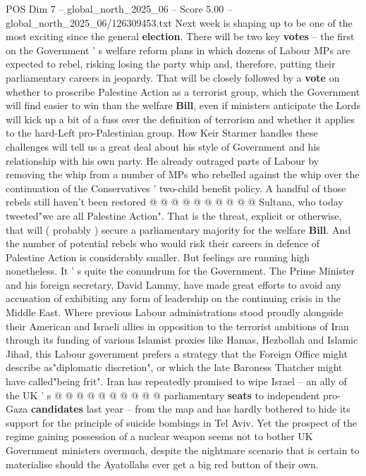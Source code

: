 \begin{textsample}{POS Dim 7 – global\_north\_2025\_06 – Score 5.00 – global\_north\_2025\_06/126309453.txt}  \label{ex:f7_pos_380}
Next week is shaping up to be one of the most exciting since the general \textbf{election}.
There will be two key \textbf{votes} -- the first on the Government ' s welfare reform plans in which dozens of Labour MPs are expected to rebel, risking losing the party whip and, therefore, putting their parliamentary careers in jeopardy.
That will be closely followed by a \textbf{vote} on whether to proscribe Palestine Action as a terrorist group, which the Government will find easier to win than the welfare \textbf{Bill}, even if ministers anticipate the Lords will kick up a bit of a fuss over the definition of terrorism and whether it applies to the hard-Left pro-Palestinian group.
How Keir Starmer handles these challenges will tell us a great deal about his style of Government and his relationship with his own party.
He already outraged parts of Labour by removing the whip from a number of MPs who rebelled against the whip over the continuation of the Conservatives ' two-child benefit policy.
A handful of those rebels still haven't been restored @ @ @ @ @ @ @ @ @ @ Sultana, who today tweeted"we are all Palestine Action".
That is the threat, explicit or otherwise, that will ( probably ) secure a parliamentary majority for the welfare \textbf{Bill}.
And the number of potential rebels who would risk their careers in defence of Palestine Action is considerably smaller.
But feelings are running high nonetheless.
It ' s quite the conundrum for the Government.
The Prime Minister and his foreign secretary, David Lammy, have made great efforts to avoid any accusation of exhibiting any form of leadership on the continuing crisis in the Middle East.
Where previous Labour administrations stood proudly alongside their American and Israeli allies in opposition to the terrorist ambitions of Iran through its funding of various Islamist proxies like Hamas, Hezbollah and Islamic Jihad, this Labour government prefers a strategy that the Foreign Office might describe as"diplomatic discretion", or which the late Baroness Thatcher might have called"being frit".
Iran has repeatedly promised to wipe Israel -- an ally of the UK ' s @ @ @ @ @ @ @ @ @ @ parliamentary \textbf{seats} to independent pro-Gaza \textbf{candidates} last year -- from the map and has hardly bothered to hide its support for the principle of suicide bombings in Tel Aviv.
Yet the prospect of the regime gaining possession of a nuclear weapon seems not to bother UK Government ministers overmuch, despite the nightmare scenario that is certain to materialise should the Ayatollahs ever get a big red button of their own.

\end{textsample}
